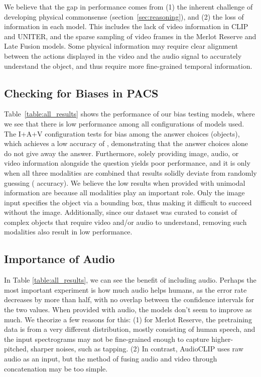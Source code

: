\documentclass[runningheads]{llncs}
\newcommand{\names}{\textsc{PACS}}
\begin{document}
We believe that the gap in performance comes from (1) the inherent challenge of developing physical commonsense (section~\ref{sec:reasoning}), and (2) the loss of information in each model. This includes the lack of video information in CLIP and UNITER, and the sparse sampling of video frames in the Merlot Reserve and Late Fusion models.
Some physical information may require clear alignment between the actions displayed in the video and the audio signal to accurately understand the object, and thus require more fine-grained temporal information.


\subsection{Checking for Biases in \names}


Table~\ref{table:all_results} shows the performance of our bias testing models, where we see that there is low performance among all configurations of models used. The I+A+V configuration tests for bias among the answer choices (objects), which achieves a low accuracy of , demonstrating that the answer choices alone do not give away the answer. Furthermore, solely providing image, audio, or video information alongside the question yields poor performance, and it is only when all three modalities are combined that results solidly deviate from randomly guessing ( accuracy).
We believe the low results when provided with unimodal information are because all modalities play an important role. Only the image input specifies the object via a bounding box, thus making it difficult to succeed without the image. Additionally, since our dataset was curated to consist of complex objects that require video and/or audio to understand, removing such modalities also result in low performance.

\subsection{Importance of Audio}
\label{sec:audio_analysis}


In Table \ref{table:all_results}, we can see the benefit of including audio. Perhaps the most important experiment is how much audio helps humans, as the error rate decreases by more than half, with no overlap between the confidence intervals for the two values.
When provided with audio, the models don't seem to improve as much. We theorize a few reasons for this: (1) for Merlot Reserve, the pretraining data is from a very different distribution, mostly consisting of human speech, and the input spectrograms may not be fine-grained enough to capture higher-pitched, sharper noises, such as tapping.
(2) In contrast, AudioCLIP uses raw audio as an input, but the method of fusing audio and video through concatenation may be too simple.
\end{document}
